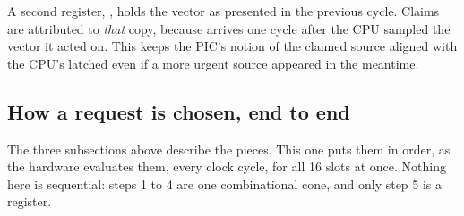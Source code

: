 A second register, , holds the vector as presented in the
previous cycle. Claims are attributed to \emph{that} copy, because
 arrives one cycle after the CPU sampled the vector it acted
on. This keeps the PIC's notion of the claimed source aligned with the CPU's
latched  even if a more urgent source appeared in the meantime.


\subsection{How a request is chosen, end to end}
\label{sec:reqchosen}

The three subsections above describe the pieces. This one puts them in order, as
the hardware evaluates them, every clock cycle, for all 16 slots at once. Nothing
here is sequential: steps 1 to 4 are one combinational cone, and only step 5 is a
register.

